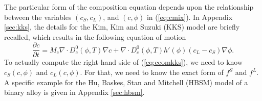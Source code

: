 The particular form of the composition equation depends upon the
relationship between the variables $(c_S,c_L)$, and $(c,\phi)$ in
(\ref{eq:cmix}).  In Appendix \ref{sec:kks}, the details for the Kim,
Kim and Suzuki (KKS) model are briefly recalled, which results in the
following equation of motion
%
\begin{equation}
  \frac{\partial c}{\partial t} =
    M_c \nabla \cdot D^0_c(\phi,T)\nabla c +
    \nabla \cdot D^0_c(\phi,T) h'(\phi) (c_L - c_S) \nabla \phi.
\label{eq:ceomkks}
\end{equation}
%
To actually compute the right-hand side of (\ref{eq:ceomkks}), we need
to know $c_S(c,\phi)$ and $c_L(c,\phi)$. For that, we need to know the
exact form of $f^S$ and $f^L$.  A specific example for the Hu, Baskes,
Stan and Mitchell (HBSM) model of a binary alloy
\cite{HuBaskesStanMitchell07} is given in Appendix \ref{sec:hbsm}.
